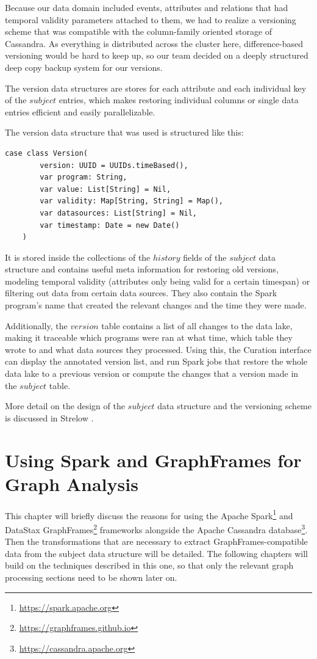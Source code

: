 \documentclass[
  a4paper,     %
  titlepage,   %
  oneside,     %
  parskip      %
]{scrartcl}          %
\begin{document}
    Because our data domain included events, attributes and relations that had
    temporal validity parameters attached to them, we had to realize a versioning
    scheme that was compatible with the column-family oriented storage of Cassandra.
    As everything is distributed across the cluster here, difference-based versioning
    would be hard to keep up, so our team decided on a deeply structured deep copy
    backup system for our versions.

    The version data structures are stores for each attribute and each individual
    key of the $subject$ entries, which makes restoring individual columns or single
    data entries efficient and easily parallelizable.

    The version data structure that was used is structured like this:
    \begin{lstlisting}[style=scalaStyle,caption=Version]
    case class Version(
    	version: UUID = UUIDs.timeBased(),
    	var program: String,
    	var value: List[String] = Nil,
    	var validity: Map[String, String] = Map(),
    	var datasources: List[String] = Nil,
    	var timestamp: Date = new Date()
    )
    \end{lstlisting}

    It is stored inside the collections of the $history$ fields of the $subject$
    data structure and contains useful meta information for restoring old versions,
    modeling temporal validity (attributes only being valid for a certain timespan)
    or filtering out data from certain data sources. They also contain the Spark
    program's name that created the relevant changes and the time they were made.

    Additionally, the $version$ table contains a list of all changes to the data lake,
    making it traceable which programs were ran at what time, which table they wrote
    to and what data sources they processed. Using this, the Curation interface
    can display the annotated version list, and run Spark jobs that restore the
    whole data lake to a previous version or compute the changes that a version
    made in the $subject$ table.

    More detail on the design of the $subject$ data structure and the versioning
    scheme is discussed in Strelow \cite{strelow}.
    \pagebreak

  \section{Using Spark and GraphFrames for Graph Analysis}
  This chapter will briefly discuss the reasons for using the
  Apache Spark\footnote{\url{https://spark.apache.org}}
  and DataStax GraphFrames\footnote{\url{https://graphframes.github.io}}
  frameworks alongside the
  Apache Cassandra database\footnote{\url{https://cassandra.apache.org}}.
  Then the transformations that are necessary to extract GraphFrames-compatible
  data from the subject data structure will be detailed.
  The following chapters will build on the techniques described in this one, so
  that only the relevant graph processing sections need to be shown later on.
\end{document}
